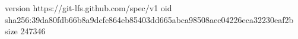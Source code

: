 version https://git-lfs.github.com/spec/v1
oid sha256:39da80fdb66b8a9dcfc864eb85403dd665abca98508aec04226eca32230eaf2b
size 247346

